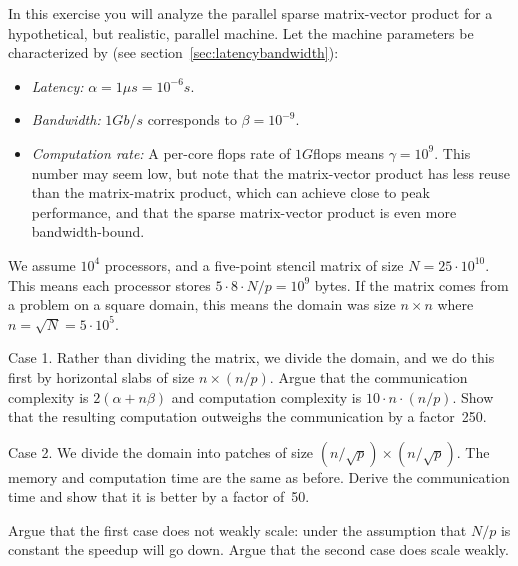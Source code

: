   In this exercise you will analyze the parallel sparse matrix-vector
  product for a hypothetical, but realistic, parallel machine.
  Let the machine parameters be characterized by (see
  section~\ref{sec:latencybandwidth}):
  \begin{itemize}
  \item {\it Latency:} $\alpha=1\mu s=10^{-6}s$.
  \item {\it Bandwidth:} $1Gb/s$ corresponds to $\beta=10^{-9}$.
  \item {\it Computation rate:} A per-core flops rate of $1G$flops
    means $\gamma=10^9$. This number may seem low, but note that the
    matrix-vector product has less reuse than the matrix-matrix
    product, which can achieve close to peak performance,
    and that the sparse matrix-vector product is even more
    bandwidth-bound.
  \end{itemize}
  We assume $10^4$ processors, and a five-point
  stencil matrix of size $N=25\cdot 10^{10}$. This means each
  processor stores $5\cdot 8\cdot N/p=10^9$ bytes. If the matrix comes
  from a problem on a square domain, this means the domain was size
  $n\times n$ where $n=\sqrt N=5\cdot 10^5$.

  Case 1. Rather than dividing the matrix, we divide the domain, and
  we do this first by horizontal slabs of size $n\times (n/p)$. Argue
  that the communication complexity is $2(\alpha+n\beta)$ and
  computation complexity is $10\cdot n\cdot (n/p)$. Show that the
  resulting computation outweighs the communication by a factor~250.

  Case 2. We divide the domain into patches of size $(n/\sqrt p)\times
  (n/\sqrt p)$. The memory and computation time are the same as
  before. Derive the communication time and show that it is better by
  a factor of~50.

  Argue that the first case does not weakly scale: under the
  assumption that $N/p$ is constant the speedup will go down.
  Argue that the second case does scale weakly.
